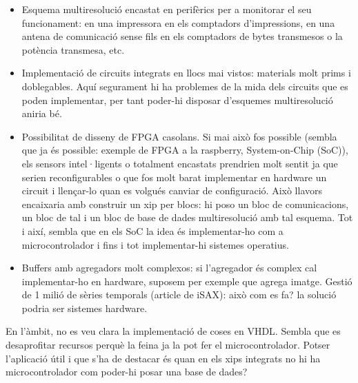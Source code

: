 \begin{itemize}
\begin{itemize}
  \item Esquema multiresolució encastat en perifèrics per a monitorar
    el seu funcionament: en una impressora en els comptadors
    d'impressions, en una antena de comunicació sense fils en els
    comptadors de bytes transmesos o la potència transmesa, etc.

  \item Implementació de circuits integrats en llocs mai vistos:
    materials molt prims i doblegables. Aquí segurament hi ha
    problemes de la mida dels circuits que es poden implementar, per
    tant poder-hi disposar d'esquemes multiresolució aniria bé.

  \item Possibilitat de disseny de FPGA casolans. Si mai això fos
    possible (sembla que ja és possible: exemple de FPGA a la
    raspberry, System-on-Chip (SoC)), els sensors intel·ligents o
    totalment encastats prendrien molt sentit ja que serien
    reconfigurables o que fos molt barat implementar en hardware un
    circuit i llençar-lo quan es volgués canviar de configuració. Això
    llavors encaixaria amb construir un xip per blocs: hi poso un bloc
    de comunicacions, un bloc de tal i un bloc de base de dades
    multiresolució amb tal esquema. Tot i així, sembla que en els SoC
    la idea és implementar-ho com a microcontrolador i fins i tot
    implementar-hi sistemes operatius.

  \item Buffers amb agregadors molt complexos: si l'agregador és complex cal implementar-ho en hardware, suposem per exemple que agrega imatge. Gestió de 1 milió de sèries temporals (article de iSAX): això com es fa? la solució podria ser sistemes hardware.


  \end{itemize}


\end{itemize}

En l'àmbit, no es veu clara la implementació de coses en VHDL. Sembla que es desaprofitar recursos perquè la feina ja la pot fer el microcontrolador. Potser l'aplicació útil i que s'ha de destacar és quan en els xips integrats no hi ha microcontrolador com poder-hi posar una base de dades?


